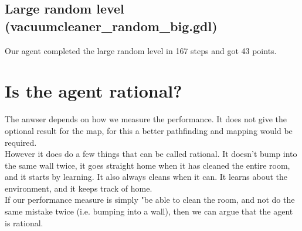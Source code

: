 \documentclass[11pt]{article}
\begin{document}
\subsection{Large random level (vacuumcleaner\_random\_big.gdl)}
Our agent completed the large random level in 167 steps and got 43 points.
\section{Is the agent rational?}
The anwser depends on how we measure the performance. It does not give the optional result for the map, for this a better pathfinding and mapping would be required.\\
However it does do a few things that can be called rational. It doesn't bump into the same wall twice, it goes straight home when it has cleaned the entire room, 
and it starts by learning. It also always cleans when it can. It learns about the environment, and it keeps track of home. \\
If our performance measure is simply "be able to clean the room, and not do the same mistake twice (i.e. bumping into a wall), then we can argue that the agent is
rational.
\end{document}
